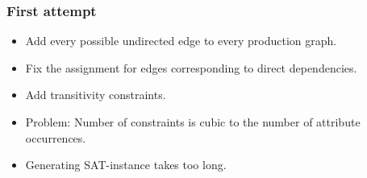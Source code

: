 \documentclass{beamer}
\begin{document}
\begin{frame}
\begin{itemize}
\begin{figure}
        \end{figure}
    \end{itemize}
\end{frame}

\begin{frame}
    \frametitle{First attempt}
    \begin{itemize}
        \item Add every possible undirected edge to every production graph.
        \item Fix the assignment for edges corresponding to direct dependencies.
        \item Add transitivity constraints.
        \item Problem: Number of constraints is cubic to the number of attribute occurrences.
        \item Generating SAT-instance takes too long.
    \end{itemize}
\end{frame}
\end{document}
